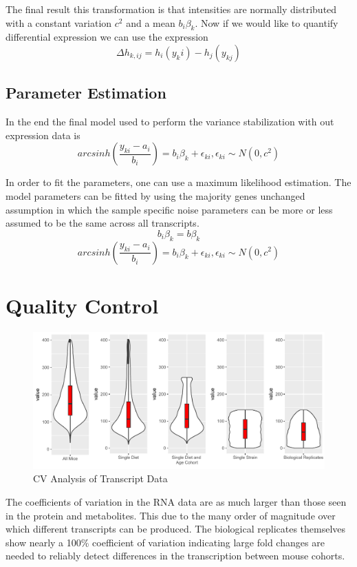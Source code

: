 \documentclass[a4paper,11pt,twoside]{book}
\begin{document}
	\begin{minipage}{\linewidth}%
		The final result this transformation is that intensities are normally distributed with a constant variation $c^2$ and a mean $b_i\beta_k$. Now if we would like to quantify differential expression we can use the expression
		$$ {\Delta}h_{k,ij} = h_i(y_ki) - h_j(y_{kj}) $$
	\end{minipage}
	
	
	\subsection{Parameter Estimation}
	
	In the end the final model used to perform the variance stabilization with out expression data is
	$$ arcsinh(\dfrac{y_{ki}-a_i}{b_i}) = b_i\beta_k + \epsilon_{ki}, \epsilon_{ki} \sim N(0,c^2)$$
	
	In order to fit the parameters, one can use a maximum likelihood estimation. The model parameters can be fitted by using the majority genes unchanged assumption in which the sample specific noise parameters can be more or less assumed to be the same across all transcripts. 
	$$ b_i\beta_k = b\beta_k $$
	$$ arcsinh(\dfrac{y_{ki}-a_i}{b_i}) = b_i\beta_k + \epsilon_{ki}, \epsilon_{ki} \sim N(0,c^2)$$
	
	
	\section{Quality Control}
	
	\begin{figure}[htb!]
		\centering
		\includegraphics[width=1.2\linewidth]{3.Trancriptomics/transcript_CV_figure}
		\caption{CV Analysis of Transcript Data}
		\label{fig:transcriptcvfigure}
	\end{figure}
	
	The coefficients of variation in the RNA data are as much larger than those seen in the protein and metabolites. This due to the many order of magnitude over which different transcripts can be produced. The biological replicates themselves show nearly a 100\% coefficient of variation indicating large fold changes are needed to reliably detect differences in the transcription between mouse cohorts. 
	
\end{document}
